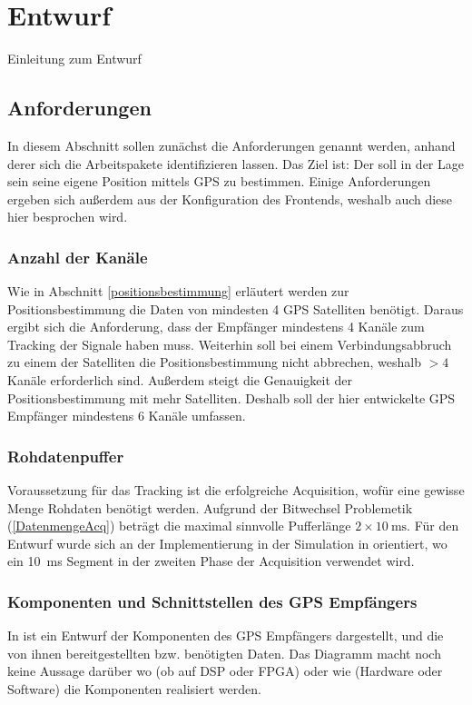 \chapter{Entwurf}
Einleitung zum Entwurf

\section{Anforderungen}
In diesem Abschnitt sollen zunächst die Anforderungen genannt werden, anhand derer sich die Arbeitspakete identifizieren lassen. Das Ziel ist: Der \dscubesat soll in der Lage sein seine eigene Position mittels GPS zu bestimmen. Einige Anforderungen ergeben sich außerdem aus der Konfiguration des Frontends, weshalb auch diese hier besprochen wird.

\subsection{Anzahl der Kanäle} Wie in Abschnitt \ref{positionsbestimmung} erläutert werden zur Positionsbestimmung die Daten von mindesten 4 GPS Satelliten benötigt. Daraus ergibt sich die Anforderung, dass der Empfänger mindestens 4 Kanäle zum Tracking der Signale haben muss. Weiterhin soll bei einem Verbindungsabbruch zu einem der Satelliten die Positionsbestimmung nicht abbrechen, weshalb $>4$ Kanäle erforderlich sind. Außerdem steigt die Genauigkeit der Positionsbestimmung mit mehr Satelliten. Deshalb soll der hier entwickelte GPS Empfänger mindestens 6 Kanäle umfassen.

\subsection{Rohdatenpuffer}
Voraussetzung für das Tracking ist die erfolgreiche Acquisition, wofür eine gewisse Menge Rohdaten benötigt werden. Aufgrund der Bitwechsel Problemetik (\ref{DatenmengeAcq}) beträgt die maximal sinnvolle Pufferlänge $2\times\SI{10}{\ms}$. Für den Entwurf wurde sich an der Implementierung in der Simulation in \cite{borre2007software} orientiert, wo ein \SI{10}{\ms} Segment in der zweiten Phase der Acquisition verwendet wird.

\subsection{Komponenten und Schnittstellen des GPS Empfängers}
In  ist ein Entwurf der Komponenten des GPS Empfängers dargestellt, und die von ihnen bereitgestellten bzw. benötigten Daten. Das Diagramm macht noch keine Aussage darüber wo (ob auf DSP oder FPGA) oder wie (Hardware oder Software) die Komponenten realisiert werden.

